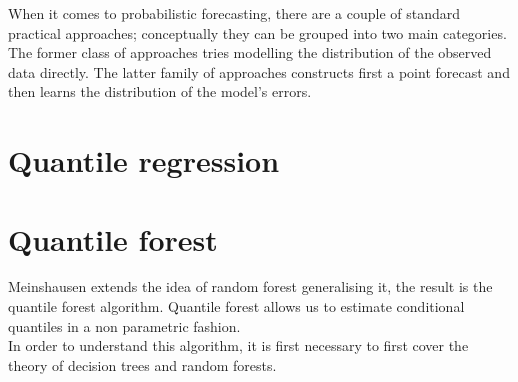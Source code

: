 When it comes to probabilistic forecasting, there are a couple of standard practical approaches; conceptually they can be grouped into two main categories. The former class of approaches tries modelling the distribution of the observed data directly. The latter family of approaches constructs first a point forecast and then learns the distribution of the model's errors.
\section{Quantile regression}


\section{Quantile forest}
Meinshausen \cite{meinshausen2006quantile} extends the idea of random forest \cite{breiman2001random} generalising it, the result is the quantile forest algorithm. Quantile forest allows us to estimate conditional quantiles in a non parametric fashion.
\\
In order to understand this algorithm, it is first necessary to first cover the theory of decision trees and random forests.
